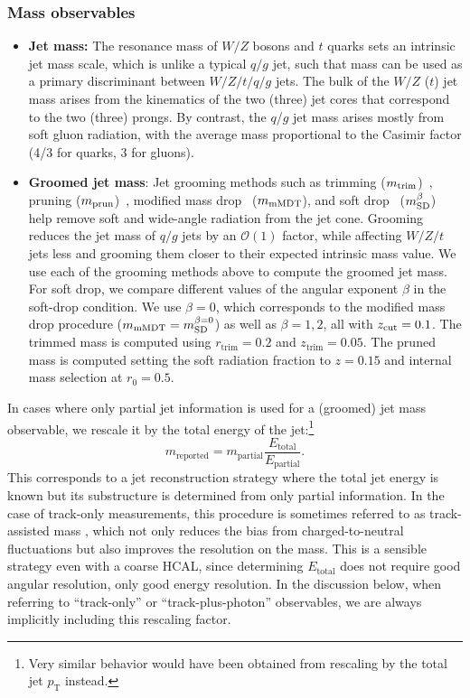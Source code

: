 \documentclass[11pt,letterpaper]{article}
\newcommand{\pt}{p_{\mathrm{T}}}
\begin{document}
\subsubsection{Mass observables}
\begin{itemize}

\item  \textbf{Jet mass:} The resonance mass of $W/Z$ bosons and $t$ quarks sets an intrinsic jet mass scale, which is unlike a typical $q/g$ jet, such that mass can be used as a primary discriminant between $W/Z/t/q/g$ jets.
%
The bulk of the $W/Z$ ($t$) jet mass arises from the kinematics of the two (three) jet cores that correspond to the two (three) prongs.
%
By contrast, the $q$/$g$ jet mass arises mostly from soft gluon radiation, with the average mass proportional to the Casimir factor (4/3 for quarks, 3 for gluons).

\item \textbf{Groomed jet mass}: Jet grooming methods such as trimming ($m_{\rm trim}$)~\cite{Krohn:2009th}, pruning ($m_{\rm prun}$)~\cite{Ellis:2009me}, modified mass drop~\cite{Butterworth:2008iy,Dasgupta:2013ihk} ($m_{\rm mMDT}$), and soft drop~\cite{Larkoski:2014wba} ($m_{\rm SD}^{\beta}$) help remove soft and wide-angle radiation from the jet cone.
%
Grooming reduces the jet mass of $q/g$ jets by an $\mathcal{O}(1)$ factor, while affecting $W/Z/t$ jets less and grooming them closer to their expected intrinsic mass value.
%
We use each of the grooming methods above to compute the groomed jet mass.
%
For soft drop, we compare different values of the angular exponent $\beta$ in the soft-drop condition. We use $\beta=0$, which corresponds to the modified mass drop procedure ($m_{\rm mMDT} = m_{\rm SD}^{\beta=0}$) as well as $\beta = 1,2$, all with $z_{\rm cut} = 0.1$.
%
The trimmed mass is computed using $r_\text{trim} = 0.2$ and $z_\text{trim} = 0.05$.
%
The pruned mass is computed setting the soft radiation fraction to $z = 0.15$ and internal mass selection at $r_0 = 0.5$.
\end{itemize}

In cases where only partial jet information is used for a (groomed) jet mass observable, we rescale it by the total energy of the jet:\footnote{Very similar behavior would have been obtained from rescaling by the total jet $\pt$ instead.}
\begin{equation}
m_{\text{reported}} = m_\text{partial} \frac{E_\text{total}}{E_\text{partial}}.
\end{equation}
%
This corresponds to a jet reconstruction strategy where the total jet energy is known but its substructure is determined from only partial information.
%
In the case of track-only measurements, this procedure is sometimes referred to as track-assisted mass \cite{ATLAS:2016vmy,Schaetzel:2013vka,Larkoski:2015yqa,Spannowsky:2015eba,Bressler:2015uma}, which not only reduces the bias from charged-to-neutral fluctuations but also improves the resolution on the mass.
%
This is a sensible strategy even with a coarse HCAL, since determining $E_\text{total}$ does not require good angular resolution, only good energy resolution.
%
In the discussion below, when referring to ``track-only'' or ``track-plus-photon'' observables, we are always implicitly including this rescaling factor.
\end{document}
